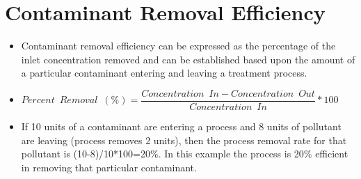 \section{Contaminant Removal Efficiency}
\begin{itemize}
\item Contaminant removal efficiency can be expressed as the percentage of the inlet concentration removed and can be established based upon the amount of a particular contaminant entering and leaving a treatment process.

\item $Percent \enspace Removal \enspace (\%) = \dfrac{Concentration \enspace  In-Concentration\enspace  Out}{Concentration \enspace In}*100$\\

\item If 10 units of a contaminant are entering a process and 8 units of pollutant are leaving (process removes 2 units), then the process removal rate for that pollutant is (10-8)/10*100=20\%.  In this example the process is 20\% efficient in removing that particular contaminant.


\end{itemize}
